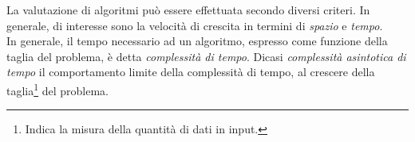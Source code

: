 \documentclass{subfiles}
\begin{document}
La valutazione di algoritmi può essere effettuata secondo diversi criteri. In generale, di interesse sono la velocità di crescita in termini di \emph{spazio} e \emph{tempo}.
\\
In generale, il tempo necessario ad un algoritmo, espresso come funzione della taglia del problema, è detta \emph{complessità di tempo}.
Dicasi \emph{complessità asintotica di tempo} il comportamento limite della complessità di tempo, al crescere della taglia\footnote[1]{Indica la misura della quantità di dati in input.} del problema.
\end{document}

